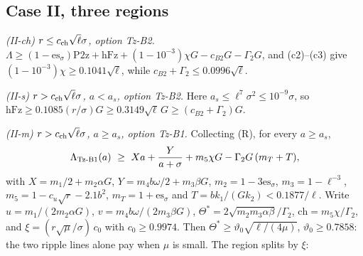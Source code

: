 \subsection{Case II, three regions}

\emph{(II-ch) $r\le c_{\rm ch}\sqrt\ell\sigma$, option Tz-B2.}
$\Lambda\ge(1-\mathrm{es}_\sigma)\mathrm{P2z}+\mathrm{hFz}+(1-10^{-3})\chi G-c_{B2}G-\Gamma_2G$, and (c2)--(c3) give $(1-10^{-3})\chi\ge0.1041\sqrt\ell$, while $c_{B2}+\Gamma_2\le0.0996\sqrt\ell$.

\emph{(II-s) $r>c_{\rm ch}\sqrt\ell\sigma$, $a<a_s$, option Tz-B2.}
Here $a_s\le\ell^7\sigma^2\le10^{-9}\sigma$, so $\mathrm{hFz}\ge0.1085(r/\sigma)G\ge0.3149\sqrt\ell\,G\ge(c_{B2}+\Gamma_2)G$.

\emph{(II-m) $r>c_{\rm ch}\sqrt\ell\sigma$, $a\ge a_s$, option Tz-B1.}
Collecting (R), for every $a\ge a_s$,
\begin{equation}
\Lambda_{\rm Tz\text{-}B1}(a)\ \ge\ Xa+\frac{Y}{a+\sigma}+m_5\chi G-\Gamma_2G\,(m_T+T),
\label{eq:IIm}
\end{equation}
with $X=m_1/2+m_2\alpha G$, $Y=m_4b\omega/2+m_3\beta G$, $m_2=1-3\mathrm{es}_\sigma$, $m_3=1-\ell^{-3}$, $m_5=1-c_u\sqrt r-2.1b^2$, $m_T=1+\mathrm{es}_\sigma$ and $T=bk_1/(Gk_2)<0.1877/\ell$.
Write $u=m_1/(2m_2\alpha G)$, $v=m_4b\omega/(2m_3\beta G)$, $\Theta^*=2\sqrt{m_2m_3\alpha\beta}/\Gamma_2$, $\mathrm{ch}=m_5\chi/\Gamma_2$, and $\xi=(r\sqrt\mu/\sigma)\,c_0$ with $c_0\ge0.9974$.
Then $\Theta^*\ge\vartheta_0\sqrt{\ell/(4\mu)}$, $\vartheta_0\ge0.7858$: the two ripple lines alone pay when $\mu$ is small.
The region splits by $\xi$:
